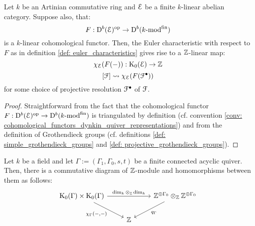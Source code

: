             \begin{lemma} \label{lemma: euler_characteristics_and_grothendieck_groups}
                Let $k$ be an Artinian commutative ring and $\mathcal{E}$ be a finite $k$-linear abelian category. Suppose also, that:
                    $$F: \mathrm{D}^b(\mathcal{E})^{\mathrm{op}} \to \mathrm{D}^b(k\text{-}\mathrm{mod}^{\mathrm{fin}})$$
                is a $k$-linear cohomological functor. Then, the Euler characteristic with respect to $F$ as in definition \ref{def: euler_characteristics} gives rise to a $\mathbb{Z}$-linear map:
                    $$\chi_{\mathcal{E}}(F(-)): \mathrm{K}_0(\mathcal{E}) \to \mathbb{Z}$$
                    $$[\mathcal{F}] \leadsto \chi_{\mathcal{E}}(F(\mathcal{F}^{\bullet}))$$
                for some choice of projective resolution $\mathcal{F}^{\bullet}$ of $\mathcal{F}$.
            \end{lemma}
                \begin{proof}
                    Straightforward from the fact that the cohomological functor $F: \mathrm{D}^b(\mathcal{E})^{\mathrm{op}} \to \mathrm{D}^b(k\text{-}\mathrm{mod}^{\mathrm{fin}})$ is triangulated by definition (cf. convention \ref{conv: cohomological_functors_dynkin_quiver_representations}) and from the definition of Grothendieck groups (cf. definitions \ref{def: simple_grothendieck_groups} and \ref{def: projective_grothendieck_groups}).
                \end{proof}
            \begin{proposition} \label{prop: tits_quadratic_forms_as_euler_characteristics}
                Let $k$ be a field and let $\Gamma := (\Gamma_1, \Gamma_0, s, t)$ be a finite connected acyclic quiver. Then, there is a commutative diagram of $\mathbb{Z}$-module and homomorphisms between them as follows:
                    $$
                        \begin{tikzcd}
                        	{\K_0(\Gamma) \x \K_0(\Gamma)} && {\Z^{\oplus \Gamma_0} \tensor_{\Z} \Z^{\oplus \Gamma_0}} \\
                        	& \Z
                        	\arrow["{\chi_{\Gamma}(-, -)}"', from=1-1, to=2-2]
                        	\arrow["{q_{\Gamma}}", from=1-3, to=2-2]
                        	\arrow["{\dim_k \tensor_{\Z} \dim_k}", from=1-1, to=1-3]
                        \end{tikzcd}
                    $$
            \end{proposition}
